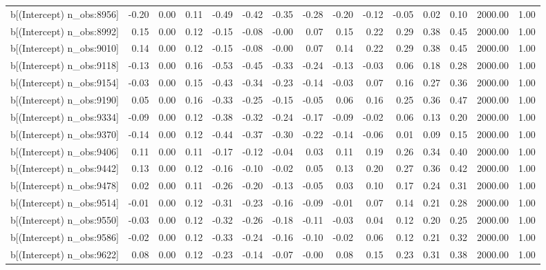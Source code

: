 \begin{table}[ht]
\begin{tabular}{rrrrrrrrrrrrrrr}
  b[(Intercept) n\_obs:8956] & -0.20 & 0.00 & 0.11 & -0.49 & -0.42 & -0.35 & -0.28 & -0.20 & -0.12 & -0.05 & 0.02 & 0.10 & 2000.00 & 1.00 \\ 
  b[(Intercept) n\_obs:8992] & 0.15 & 0.00 & 0.12 & -0.15 & -0.08 & -0.00 & 0.07 & 0.15 & 0.22 & 0.29 & 0.38 & 0.45 & 2000.00 & 1.00 \\ 
  b[(Intercept) n\_obs:9010] & 0.14 & 0.00 & 0.12 & -0.15 & -0.08 & -0.00 & 0.07 & 0.14 & 0.22 & 0.29 & 0.38 & 0.45 & 2000.00 & 1.00 \\ 
  b[(Intercept) n\_obs:9118] & -0.13 & 0.00 & 0.16 & -0.53 & -0.45 & -0.33 & -0.24 & -0.13 & -0.03 & 0.06 & 0.18 & 0.28 & 2000.00 & 1.00 \\ 
  b[(Intercept) n\_obs:9154] & -0.03 & 0.00 & 0.15 & -0.43 & -0.34 & -0.23 & -0.14 & -0.03 & 0.07 & 0.16 & 0.27 & 0.36 & 2000.00 & 1.00 \\ 
  b[(Intercept) n\_obs:9190] & 0.05 & 0.00 & 0.16 & -0.33 & -0.25 & -0.15 & -0.05 & 0.06 & 0.16 & 0.25 & 0.36 & 0.47 & 2000.00 & 1.00 \\ 
  b[(Intercept) n\_obs:9334] & -0.09 & 0.00 & 0.12 & -0.38 & -0.32 & -0.24 & -0.17 & -0.09 & -0.02 & 0.06 & 0.13 & 0.20 & 2000.00 & 1.00 \\ 
  b[(Intercept) n\_obs:9370] & -0.14 & 0.00 & 0.12 & -0.44 & -0.37 & -0.30 & -0.22 & -0.14 & -0.06 & 0.01 & 0.09 & 0.15 & 2000.00 & 1.00 \\ 
  b[(Intercept) n\_obs:9406] & 0.11 & 0.00 & 0.11 & -0.17 & -0.12 & -0.04 & 0.03 & 0.11 & 0.19 & 0.26 & 0.34 & 0.40 & 2000.00 & 1.00 \\ 
  b[(Intercept) n\_obs:9442] & 0.13 & 0.00 & 0.12 & -0.16 & -0.10 & -0.02 & 0.05 & 0.13 & 0.20 & 0.27 & 0.36 & 0.42 & 2000.00 & 1.00 \\ 
  b[(Intercept) n\_obs:9478] & 0.02 & 0.00 & 0.11 & -0.26 & -0.20 & -0.13 & -0.05 & 0.03 & 0.10 & 0.17 & 0.24 & 0.31 & 2000.00 & 1.00 \\ 
  b[(Intercept) n\_obs:9514] & -0.01 & 0.00 & 0.12 & -0.31 & -0.23 & -0.16 & -0.09 & -0.01 & 0.07 & 0.14 & 0.21 & 0.28 & 2000.00 & 1.00 \\ 
  b[(Intercept) n\_obs:9550] & -0.03 & 0.00 & 0.12 & -0.32 & -0.26 & -0.18 & -0.11 & -0.03 & 0.04 & 0.12 & 0.20 & 0.25 & 2000.00 & 1.00 \\ 
  b[(Intercept) n\_obs:9586] & -0.02 & 0.00 & 0.12 & -0.33 & -0.24 & -0.16 & -0.10 & -0.02 & 0.06 & 0.12 & 0.21 & 0.32 & 2000.00 & 1.00 \\ 
  b[(Intercept) n\_obs:9622] & 0.08 & 0.00 & 0.12 & -0.23 & -0.14 & -0.07 & -0.00 & 0.08 & 0.15 & 0.23 & 0.31 & 0.38 & 2000.00 & 1.00 \\ 

\end{tabular}
\end{table}
